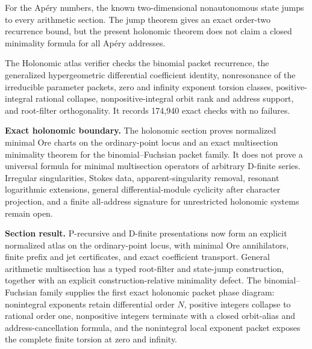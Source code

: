 For the Ap\'ery numbers, the known two-dimensional nonautonomous state jumps to every arithmetic section.  The jump theorem gives an exact order-two recurrence bound, but the present holonomic theorem does not claim a closed minimality formula for all Ap\'ery addresses.




The Holonomic atlas verifier checks the binomial packet recurrence, the generalized hypergeometric differential coefficient identity, nonresonance of the irreducible parameter packets, zero and infinity exponent torsion classes, positive-integral rational collapse, nonpositive-integral orbit rank and address support, and root-filter orthogonality.  It records 174,940 exact checks with no failures.

\begin{boundarybox}
\textbf{Exact holonomic boundary.}
The holonomic section proves normalized minimal Ore charts on the ordinary-point locus and an exact multisection minimality theorem for the binomial--Fuchsian packet family.  It does not prove a universal formula for minimal multisection operators of arbitrary D-finite series.  Irregular singularities, Stokes data, apparent-singularity removal, resonant logarithmic extensions, general differential-module cyclicity after character projection, and a finite all-address signature for unrestricted holonomic systems remain open.
\end{boundarybox}

\begin{resultbox}
\textbf{Section result.}
P-recursive and D-finite presentations now form an explicit normalized atlas on the ordinary-point locus, with minimal Ore annihilators, finite prefix and jet certificates, and exact coefficient transport.  General arithmetic multisection has a typed root-filter and state-jump construction, together with an explicit construction-relative minimality defect.  The binomial--Fuchsian family supplies the first exact holonomic packet phase diagram: nonintegral exponents retain differential order $N$, positive integers collapse to rational order one, nonpositive integers terminate with a closed orbit-alias and address-cancellation formula, and the nonintegral local exponent packet exposes the complete finite torsion at zero and infinity.
\end{resultbox}
